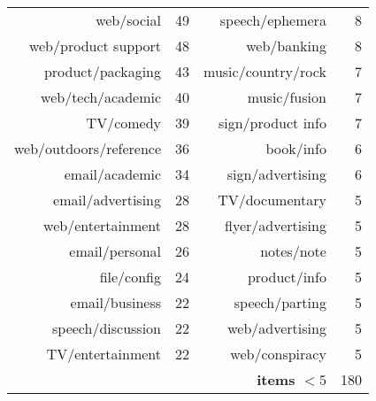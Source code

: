 \begin{table}[ht]
\begin{tabular}{r r || r r}
      web/social &  49 & speech/ephemera &   8  \\
      web/product support &  48 & web/banking &   8  \\
      product/packaging &  43 & music/country/rock &   7  \\
      web/tech/academic &  40 & music/fusion &   7  \\
      TV/comedy &  39 & sign/product info &   7  \\
      web/outdoors/reference &  36 & book/info &   6  \\
      email/academic &  34 & sign/advertising &   6  \\
      email/advertising &  28 & TV/documentary &   5  \\
      web/entertainment &  28 & flyer/advertising &   5 \\ 
      email/personal &  26 & notes/note &   5  \\
      file/config &  24 & product/info &   5  \\
      email/business &  22 & speech/parting &   5  \\
      speech/discussion &  22 & web/advertising &   5  \\
      TV/entertainment &  22 & web/conspiracy &   5  \\
      & & \textbf{items $< 5$} & 180 \\


\end{tabular}
\end{table}
